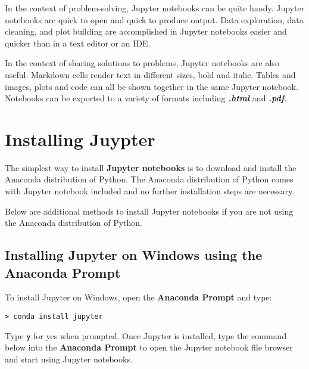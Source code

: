 \documentclass{book}
\newcommand{\passthrough}[1]{#1}
\begin{document}
    
        In the context of problem-solving, Jupyter notebooks can be quite handy.
Jupyter notebooks are quick to open and quick to produce output. Data
exploration, data cleaning, and plot building are accomplished in
Jupyter notebooks easier and quicker than in a text editor or an IDE.

In the context of sharing solutions to problems, Jupyter notebooks are
also useful. Markdown cells render text in different sizes, bold and
italic. Tables and images, plots and code can all be shown together in
the same Jupyter notebook. Notebooks can be exported to a variety of
formats including \textbf{\emph{.html}} and \textbf{\emph{.pdf}}.
    




    
        \hypertarget{installing-juypter}{%
\section{Installing Juypter}\label{installing-juypter}}
    




    
        The simplest way to install \textbf{Jupyter notebooks} is to download
and install the Anaconda distribution of Python. The Anaconda
distribution of Python comes with Jupyter notebook included and no
further installation steps are necessary.

Below are additional methods to install Jupyter notebooks if you are not
using the Anaconda distribution of Python.
    




    
        \hypertarget{installing-jupyter-on-windows-using-the-anaconda-prompt}{%
\subsection{Installing Jupyter on Windows using the Anaconda
Prompt}\label{installing-jupyter-on-windows-using-the-anaconda-prompt}}

To install Jupyter on Windows, open the \textbf{Anaconda Prompt} and
type:

\begin{lstlisting}
> conda install jupyter
\end{lstlisting}

Type \passthrough{\lstinline!y!} for yes when prompted. Once Jupyter is
installed, type the command below into the \textbf{Anaconda Prompt} to
open the Jupyter notebook file browser and start using Jupyter
notebooks.
\end{document}

